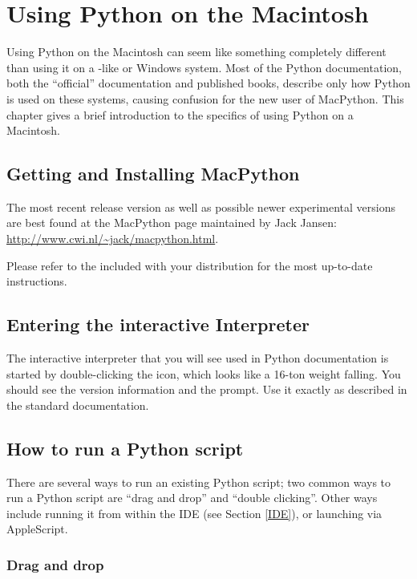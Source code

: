 \chapter{Using Python on the Macintosh \label{using}}

Using Python on the Macintosh can seem like something completely
different than using it on a \UNIX-like or Windows system. Most of the
Python documentation, both the ``official'' documentation and
published books, describe only how Python is used on these systems,
causing confusion for the new user of MacPython. This chapter gives a
brief introduction to the specifics of using Python on a Macintosh.


\section{Getting and Installing MacPython \label{getting}}

The most recent release version as well as possible newer experimental
versions are best found at the MacPython page maintained by Jack
Jansen: \url{http://www.cwi.nl/~jack/macpython.html}.


Please refer to the  included with your distribution for
the most up-to-date instructions.


\section{Entering the interactive Interpreter
         \label{interpreter}}

The interactive interpreter that you will see used in Python
documentation is started by double-clicking the
 icon, which looks like a 16-ton weight
falling. You should see the version information and the
\samp{>\code{>}>~} prompt.  Use it exactly as described in the
standard documentation.


\section{How to run a Python script}

There are several ways to run an existing Python script; two common
ways to run a Python script are ``drag and drop'' and ``double
clicking''.  Other ways include running it from within the IDE (see
Section \ref{IDE}), or launching via AppleScript.


\subsection{Drag and drop}

